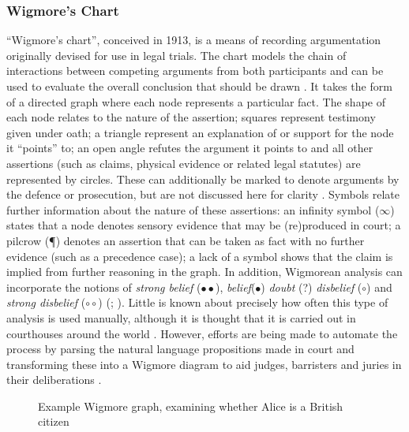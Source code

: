 \subsubsection{Wigmore's Chart}
``Wigmore's chart'', conceived in 1913, is a means of recording argumentation originally devised for use in legal trials. The chart models the chain of interactions between competing arguments from both participants and can be used to evaluate the overall conclusion that should be drawn \citep[p.~751]{Wigmore1913}. It takes the form of a directed graph where each node represents a particular fact. The shape of each node relates to the nature of the assertion; squares represent testimony given under oath; a triangle represent an explanation of or support for the node it ``points'' to; an open angle refutes the argument it points to and all other assertions (such as claims, physical evidence or related legal statutes) are represented by circles. These can additionally be marked to denote arguments by the defence or prosecution, but are not discussed here for clarity \citep{Chalamish2011, Chalamish2013}. Symbols relate further information about the nature of these assertions: an infinity symbol ($\infty$) states that a node denotes sensory evidence that may be (re)produced in court; a pilcrow (\P) denotes an assertion that can be taken as fact with no further evidence (such as a precedence case); a lack of a symbol shows that the claim is implied from further reasoning in the graph. In addition, Wigmorean analysis can incorporate the notions of \textit{strong belief} ($\bullet\bullet$), \textit{belief}($\bullet$) \textit{doubt} (?) \textit{disbelief} ($\circ$) and \textit{strong disbelief} ($\circ\circ$) (\citealp[p.~751-756]{Wigmore1913}; \citealp{Goodwin2000}). Little is known about precisely how often this type of analysis is used manually, although it is thought that it is carried out in courthouses around the world \citep{Chalamish2011}. However, efforts are being made to automate the process by parsing the natural language propositions made in court and transforming these into a Wigmore diagram to aid judges, barristers and juries in their deliberations \citep{Chalamish2013}.

\begin{figure}[h!]

\caption{Example Wigmore graph, examining whether Alice is a British citizen}
\label{figure:wigmore}
\end{figure}


